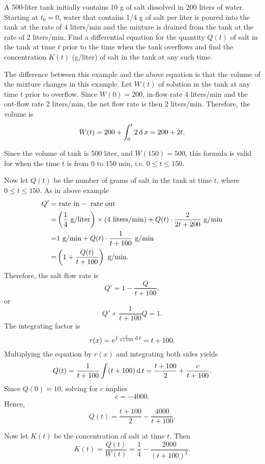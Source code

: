 \begin{example}
  A 500-liter tank initially contains 10 g of salt dissolved in 200 liters of water. Starting at $t_0=0$, water that contains 1/4 g of salt per liter is poured into the tank at the rate of 4 liters/min and the mixture is drained from the tank at the rate of 2 liters/min. Find a differential equation for the quantity $Q(t)$ of salt in the tank at time $t$ prior to the time when the tank overflows and find the concentration $K(t)$ (g/liter) of salt in the tank at any such time.
\end{example}
\begin{solution}
  The difference between this example and the above equation is that the volume of the mixture changes in this example. Let $W(t)$ of solution in the tank at any time $t$ prior to overflow. Since $W(0) = 200$, in-flow rate 4 liters/min and the out-flow rate 2 liters/min, the net flow rate is then 2 liters/min. Therefore, the volume is
  \[W(t) = 200+\int_0^t 2\operatorname{d} x=200+2t.\]
  
  Since the volume of tank is 500 liter, and $W(150)=500$, this formula is valid for when the time $t$ is from $0$ to $150$ min, i.e. $0\le t\le 150$.
  
  Now let $Q(t)$ be the number of grams of salt in the tank at time $t$, where $0 \le t \le 150$. As in above example  
  \[
    \begin{aligned}
      Q' =& \textup{ rate in}-\textup{ rate out}\\
        =&\left(\frac{1}{4} \textup{ g/liter}\right) \times (4 \textup{ liters/min}) + Q(t)\cdot\frac{2}{2t+200} \textup{ g/min}\\
        =&1\textup{ g/min} + Q(t)\cdot \frac{1}{t+100} \textup{ g/min}\\
        =&\left(1 + \frac{Q(t)}{t+100}\right) \textup{ g/min}.
    \end{aligned}
    \]
  Therefore, the salt flow rate is
  \[Q'=1-\frac{Q}{t+100},\]
  or
  \[Q'+\frac{1}{t+100}Q=1.\]
  The integrating factor is
  \[r(x)=e^{\int \frac{1}{t+100}\operatorname{d} t}=t+100.\]
  Multiplying the equation by $r(x)$ and integrating both sides yields
  \[Q(t)=\frac{1}{t+100}\int(t+100)\operatorname{d} t=\frac{t+100}{2}+\frac{c}{t+100}.\]
  Since $Q(0)=10$, solving for $c$ implies
  \[c=-4000.\]
  Hence,
  \[Q(t) =\frac{t+100}{2}-\frac{4000}{t+100}.\]
  
  Now let $K(t)$ be the concentration of salt at time $t$. Then
  \[K(t)=\frac{Q(t)}{W(t)}= \frac{1}{4}-\frac{2000}{(t+100)^2}.\]
\end{solution}


